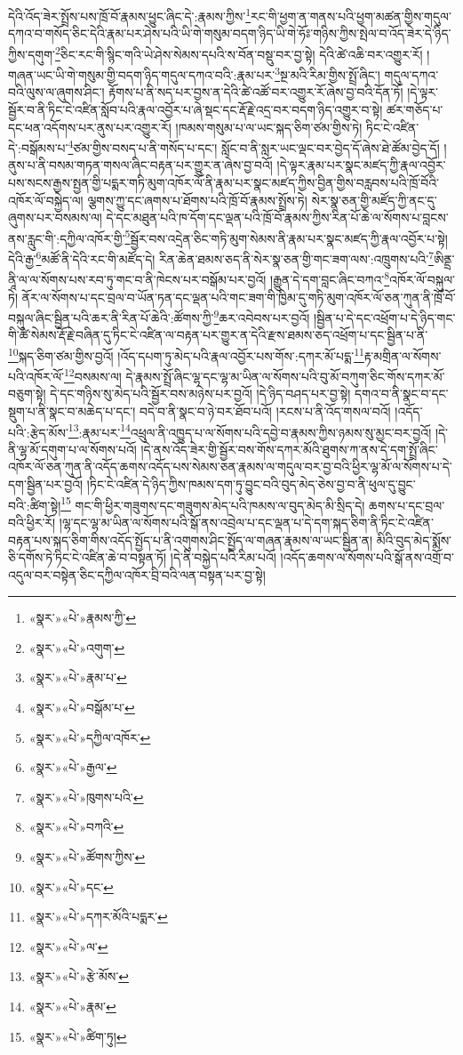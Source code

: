 དེའི་འོད་ཟེར་སྤྲོས་པས་ཁྲོ་བོ་རྣམས་ཕྱུང་ཞིང་དེ་:རྣམས་ཀྱིས་\footnote{«སྣར་»«པེ་»རྣམས་ཀྱི་}རང་གི་ཕྱག་ན་གནས་པའི་ཕྱག་མཚན་གྱིས་གདུལ་དཀའ་བ་གསོད་ཅིང་དེའི་རྣམ་པར་ཤེས་པའི་ཡི་གེ་གསུམ་བདག་ཉིད་ཡི་གེ་ཧོཿ་གཉིས་ཀྱིས་སྤེལ་བ་འོད་ཟེར་དེ་ཉིད་ཀྱིས་དགུག་\footnote{«སྣར་»«པེ་»འགུག་}ཅིང་རང་གི་སྙིང་གའི་ཡེ་ཤེས་སེམས་དཔའི་ས་བོན་བསྡུ་བར་བྱ་སྟེ། དེའི་ཚེ་འཆི་བར་འགྱུར་རོ། །གཞན་ཡང་ཡི་གེ་གསུམ་གྱི་བདག་ཉིད་གདུལ་དཀའ་བའི་:རྣམ་པར་\footnote{«སྣར་»«པེ་»རྣམ་པ་}སྔ་མའི་རིམ་གྱིས་སྤྲོ་ཞིང་། གདུལ་དཀའ་བའི་ལུས་ལ་ཞུགས་ཤིང་། རྟོགས་པ་ནི་སད་པར་བྱས་ན་དེའི་ཚེ་འཚོ་བར་འགྱུར་རོ་ཞེས་བྱ་བའི་དོན་ཏོ། །དེ་ལྟར་སྦྱོར་བ་ནི་ཏིང་ངེ་འཛིན་སློབ་པའི་རྣལ་འབྱོར་པ་ཞེ་སྡང་དང་རྡོ་རྗེ་འདྲ་བར་བདག་ཉིད་འགྱུར་བ་སྟེ། ཚར་གཅོད་པ་དང་ཕན་འདོགས་པར་ནུས་པར་འགྱུར་རོ། །ཁམས་གསུམ་པ་ལ་ཡང་སྐད་ཅིག་ཙམ་གྱིས་ཏེ། ཏིང་ངེ་འཛིན་དེ་:བསྒོམས་པ་\footnote{«སྣར་»«པེ་»བསྒོམ་པ་}ཙམ་གྱིས་བསད་པ་ནི་གསོད་པ་དང་། སློང་བ་ནི་སླར་ཡང་ལྡང་བར་བྱེད་དོ་ཞེས་ཐེ་ཚོམ་བྱེད་དོ། །ནུས་པ་ནི་བསམ་གཏན་གསལ་ཞིང་བརྟན་པར་གྱུར་ན་ཞེས་བྱ་བའོ། །དེ་ལྟར་རྣམ་པར་སྣང་མཛད་ཀྱི་རྣལ་འབྱོར་པས་སངས་རྒྱས་སྤྱན་གྱི་པདྨར་གཏི་མུག་འཁོར་ལོ་ནི་རྣམ་པར་སྣང་མཛད་ཀྱིས་བྱིན་གྱིས་བརླབས་པའི་ཁྲོ་བོའི་འཁོར་ལོ་བསྐྱེད་ལ། ལྕགས་ཀྱུ་དང་ཞགས་པ་ཐོགས་པའི་ཁྲོ་བོ་རྣམས་སྤྲོས་ཏེ། སེར་སྣ་ཅན་གྱི་མཛོད་ཀྱི་ནང་དུ་ཞུགས་པར་བསམས་ལ། དེ་དང་མཐུན་པའི་ཁ་དོག་དང་ལྡན་པའི་ཁྲོ་བོ་རྣམས་ཀྱིས་རིན་པོ་ཆེ་ལ་སོགས་པ་བླངས་ནས་རླུང་གི་:དཀྱིལ་འཁོར་གྱི་\footnote{«སྣར་»«པེ་»དཀྱིལ་འཁོར་}སྦྱོར་བས་འདྲེན་ཅིང་གཏི་མུག་སེམས་ནི་རྣམ་པར་སྣང་མཛད་ཀྱི་རྣལ་འབྱོར་པ་སྟེ། དེའི་རྒྱ་\footnote{«སྣར་»«པེ་»རྒྱལ་}མཚོ་ནི་དེའི་རང་གི་མཛོད་དེ། རིན་ཆེན་ཐམས་ཅད་ནི་སེར་སྣ་ཅན་གྱི་གང་ཟག་ལས་:འཁྲུགས་པའི་\footnote{«སྣར་»«པེ་»ཁུགས་པའི་}ཨིནྡྲ་ནཱི་ལ་ལ་སོགས་པས་རབ་ཏུ་གང་བ་ནི་ཁེངས་པར་བསྒོམ་པར་བྱའོ། །རྒྱུན་དེ་དག་བླང་ཞིང་བཀའ་\footnote{«སྣར་»«པེ་»བཀའི་}འཁོར་ལོ་བསྐུལ་ཏེ། ནོར་ལ་སོགས་པ་དང་བྲལ་བ་ཡོན་ཏན་དང་ལྡན་པའི་གང་ཟག་གི་ཁྱིམ་དུ་གཏི་མུག་འཁོར་ལོ་ཅན་ཀུན་ནི་ཁྲོ་བོ་བསྐུལ་ཞིང་སྦྱིན་པའི་ཆར་ནི་རིན་པོ་ཆེའི་:ཚོགས་ཀྱི་\footnote{«སྣར་»«པེ་»ཚོགས་ཀྱིས་}ཆར་འབེབས་པར་བྱའོ། །སྦྱིན་པ་དེ་དང་འཕྲོག་པ་དེ་ཉིད་གང་གི་ཚེ་སེམས་རྡོ་རྗེ་བཞིན་དུ་ཏིང་ངེ་འཛིན་ལ་བརྟན་པར་གྱུར་ན་དེའི་རྫས་ཐམས་ཅད་འཕྲོག་པ་དང་སྦྱིན་པ་ནི་\footnote{«སྣར་»«པེ་»དང་}སྐད་ཅིག་ཙམ་གྱིས་བྱའོ། །འོད་དཔག་ཏུ་མེད་པའི་རྣལ་འབྱོར་པས་གོས་:དཀར་མོ་པདྨ་\footnote{«སྣར་»«པེ་»དཀར་མོའི་པདྨར་}རྟ་མགྲིན་ལ་སོགས་པའི་འཁོར་ལོ་\footnote{«སྣར་»«པེ་»ལ་}བསམས་ལ། དེ་རྣམས་སྤྲོ་ཞིང་ལྷ་དང་ལྷ་མ་ཡིན་ལ་སོགས་པའི་བུ་མོ་བཀུག་ཅིང་གོས་དཀར་མོ་བཅུག་སྟེ། དེ་དང་གཉིས་སུ་མེད་པའི་སྦྱོར་བས་མཉེས་པར་བྱའོ། །དེ་ཉིད་བཤད་པར་བྱ་སྟེ། དགའ་བ་ནི་སྣང་བ་དང་སྡུག་པ་ནི་སྣང་བ་མཆེད་པ་དང་། བདེ་བ་ནི་སྣང་བ་ཉེ་བར་ཐོབ་པའོ། །རངས་པ་ནི་འོད་གསལ་བའོ། །འདོད་པའི་:རྩེད་མོས་\footnote{«སྣར་»«པེ་»རྩེ་མོས་}:རྣམ་པར་\footnote{«སྣར་»«པེ་»རྣམ་}འཕྲུལ་ནི་འཁྱུད་པ་ལ་སོགས་པའི་དབྱེ་བ་རྣམས་ཀྱིས་ཉམས་སུ་མྱང་བར་བྱའོ། །དེ་ནི་ལྷ་མོ་དགུག་པ་ལ་སོགས་པའོ། །དེ་ནས་འོད་ཟེར་གྱི་སྦྱོར་བས་གོས་དཀར་མོའི་ཐུགས་ཀ་ནས་དེ་དག་སྤྲོ་ཞིང་འཁོར་ལོ་ཅན་ཀུན་ནི་འདོད་ཆགས་འདོད་པས་སེམས་ཅན་རྣམས་ལ་གདུལ་བར་བྱ་བའི་ཕྱིར་ལྷ་མོ་ལ་སོགས་པ་དེ་དག་སྦྱིན་པར་བྱའོ། །ཏིང་ངེ་འཛིན་དེ་ཉིད་ཀྱིས་ཁམས་དག་ཏུ་བྱུང་བའི་བུད་མེད་ཅེས་བྱ་བ་ནི་ཕུལ་དུ་བྱུང་བའི་:ཚིག་སྟེ།\footnote{«སྣར་»«པེ་»ཚིག་ཏུ།} གང་གི་ཕྱིར་གཟུགས་དང་གཟུགས་མེད་པའི་ཁམས་ལ་བུད་མེད་མི་སྲིད་དེ། ཆགས་པ་དང་བྲལ་བའི་ཕྱིར་རོ། །ལྷ་དང་ལྷ་མ་ཡིན་ལ་སོགས་པའི་སྒོ་ནས་འབྲེལ་པ་དང་ལྡན་པ་དེ་དག་སྐད་ཅིག་ནི་ཏིང་ངེ་འཛིན་བརྟན་པས་སྐད་ཅིག་གིས་འདོད་སྤྱོད་པ་ནི་འགུགས་ཤིང་སྤྱོད་ལ་གཞན་རྣམས་ལ་ཡང་སྦྱིན་ན། མིའི་བུད་མེད་སྨོས་ཅི་དགོས་ཏེ་ཏིང་ངེ་འཛིན་ཆེ་བ་བསྟན་ཏོ། །དེ་ནི་བསྐྱེད་པའི་རིམ་པའོ། །འདོད་ཆགས་ལ་སོགས་པའི་སྒོ་ནས་འགྲོ་བ་འདུལ་བར་བསྟེན་ཅིང་དཀྱིལ་འཁོར་བྲི་བའི་ལན་བསྟན་པར་བྱ་སྟེ། 
